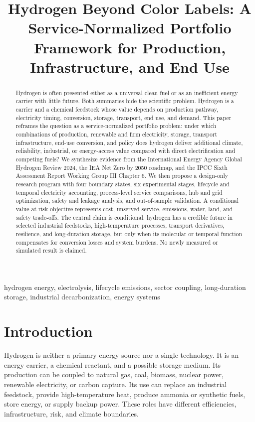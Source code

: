 \documentclass[conference]{IEEEtran}
\title{Hydrogen Beyond Color Labels: A Service-Normalized Portfolio Framework for Production, Infrastructure, and End Use}
\author{\IEEEauthorblockN{Research Design Report}\IEEEauthorblockA{Four-Agent Scientific Workflow: Survey--Idea--ExperimentDesign--Author}}
\begin{document}
\maketitle
\begin{abstract}
Hydrogen is often presented either as a universal clean fuel or as an inefficient energy carrier with little future. Both summaries hide the scientific problem. Hydrogen is a carrier and a chemical feedstock whose value depends on production pathway, electricity timing, conversion, storage, transport, end use, and demand. This paper reframes the question as a service-normalized portfolio problem: under which combinations of production, renewable and firm electricity, storage, transport infrastructure, end-use conversion, and policy does hydrogen deliver additional climate, reliability, industrial, or energy-access value compared with direct electrification and competing fuels? We synthesize evidence from the International Energy Agency Global Hydrogen Review 2024, the IEA Net Zero by 2050 roadmap, and the IPCC Sixth Assessment Report Working Group III Chapter 6. We then propose a design-only research program with four boundary states, six experimental stages, lifecycle and temporal electricity accounting, process-level service comparisons, hub and grid optimization, safety and leakage analysis, and out-of-sample validation. A conditional value-at-risk objective represents cost, unserved service, emissions, water, land, and safety trade-offs. The central claim is conditional: hydrogen has a credible future in selected industrial feedstocks, high-temperature processes, transport derivatives, resilience, and long-duration storage, but only when its molecular or temporal function compensates for conversion losses and system burdens. No newly measured or simulated result is claimed.
\end{abstract}
\begin{IEEEkeywords}
hydrogen energy, electrolysis, lifecycle emissions, sector coupling, long-duration storage, industrial decarbonization, energy systems
\end{IEEEkeywords}

\section{Introduction}
\label{sec:intro}
Hydrogen is neither a primary energy source nor a single technology. It is an energy carrier, a chemical reactant, and a possible storage medium. Its production can be coupled to natural gas, coal, biomass, nuclear power, renewable electricity, or carbon capture. Its use can replace an industrial feedstock, provide high-temperature heat, produce ammonia or synthetic fuels, store energy, or supply backup power. These roles have different efficiencies, infrastructure, risk, and climate boundaries.
\end{document}
